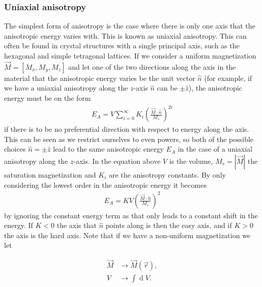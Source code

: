 \documentclass[12pt, a4paper, twoside, openright]{article}		%
\renewcommand{\d}[1]{\ensuremath{\operatorname{d}\!{#1}}}
\numberwithin{equation}{section}
\begin{document}
\subsubsection{Uniaxial anisotropy}
The simplest form of anisotropy is the case where there is only one axis that the anisotropic energy varies with. This is known as uniaxial anisotropy. This can often be found in crystal structures with a single principal axis, such as the hexagonal and simple tetragonal lattices. If we consider a uniform magnetization $\vec{M} = \left[M_x, M_y, M_z\right]$ and let one of the two directions along the axis in the material that the anisotropic energy varies be the unit vector $\hat{n}$ (for example, if we have a uniaxial anisotropy along the $z$-axis $\hat{n}$ can be $\pm\hat{z}$), the anisotropic energy must be on the form
\begin{align}
\label{eq:uniaxialanisotropy}
E_A = V \sum_{i=0}^{\infty} K_i \left(\frac{\vec{M}\cdot\hat{n}}{M_s}\right)^{2i}
\end{align}
if there is to be no preferential direction with respect to energy along the axis. This can be seen as we restrict ourselves to even powers, so both of the possible choices $\hat{n}=\pm\hat{z}$ lead to the same anisotropic energy $E_A$ in the case of a uniaxial anisotropy along the $z$-axis. In the equation above $V$ is the volume, $M_s = |\vec{M}|$ the saturation magnetization and $K_i$ are the anisotropy constants. By only considering the lowest order in the anisotropic energy it becomes
\begin{align}
\label{eq:uniaxialanisotropy_v2}
E_A = K V \left(\frac{\vec{M}\cdot\hat{n}}{M_s}\right)^2
\end{align}
by ignoring the constant energy term as that only leads to a constant shift in the energy. If $K < 0$ the axis that $\hat{n}$ points along is then the easy axis, and if $K > 0$ the axis is the hard axis. Note that if we have a non-uniform magnetization we let

\begin{align*}
\vec{M} &\rightarrow \vec{M}(\vec{r}), \\
V &\rightarrow \int \d V.
\end{align*}
\end{document}
